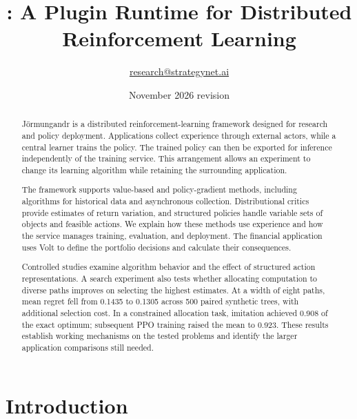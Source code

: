 \documentclass{strategynet-journal}
\title{\JORM{}: A Plugin Runtime for Distributed Reinforcement Learning}
\author{\href{mailto:research@strategynet.ai}{research@strategynet.ai}}
\date{November 2026 revision}
\begin{document}
\maketitle

\begin{abstract}
Jörmungandr is a distributed reinforcement-learning framework designed for
research and policy deployment. Applications collect experience through
external actors, while a central learner trains the policy. The trained
policy can then be exported for inference independently of the training
service. This arrangement allows an experiment to change its learning
algorithm while retaining the surrounding application.

The framework supports value-based and policy-gradient methods, including
algorithms for historical data and asynchronous collection. Distributional
critics provide estimates of return variation, and structured policies handle
variable sets of objects and feasible actions. We explain how these methods
use experience and how the service manages training, evaluation, and deployment.
The financial application uses Volt to define the portfolio decisions and
calculate their consequences.

Controlled studies examine algorithm behavior and the effect of structured
action representations. A search experiment also tests whether allocating
computation to diverse paths improves on selecting the highest estimates.
At a width of eight paths, mean regret fell from 0.1435 to 0.1305 across 500
paired synthetic trees, with additional selection cost. In a constrained
allocation task, imitation achieved 0.908 of the exact optimum; subsequent
PPO training raised the mean to 0.923. These results establish working
mechanisms on the tested problems and identify the larger application
comparisons still needed.

\end{abstract}

\SNtwocolumntableofcontents

\section{Introduction}
\end{document}

